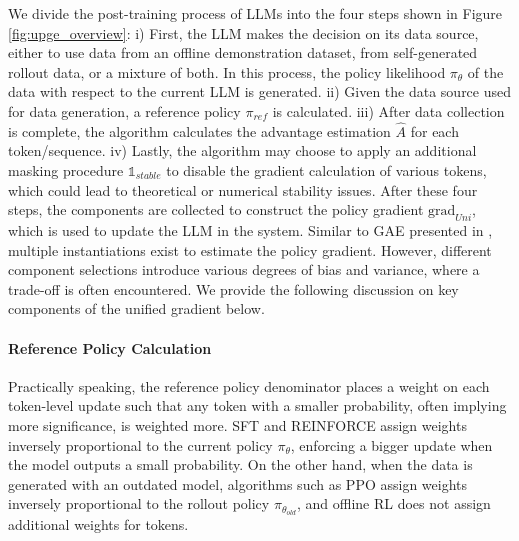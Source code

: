 We divide the post-training process of LLMs into the four steps shown in Figure \ref{fig:upge_overview}: i) First, the LLM makes the decision on its data source, either to use data from an offline demonstration dataset, from self-generated rollout data, or a mixture of both. In this process, the policy likelihood $\pi_\theta$ of the data with respect to the current LLM is generated. ii) Given the data source used for data generation, a reference policy $\pi_{ref}$ is calculated. iii) After data collection is complete, the algorithm calculates the advantage estimation $\hat{A}$ for each token/sequence. iv) Lastly, the algorithm may choose to apply an additional masking procedure $\mathbb{1}_{stable}$ to disable the gradient calculation of various tokens, which could lead to theoretical or numerical stability issues. After these four steps, the components are collected to construct the policy gradient $\text{grad}_{Uni}$, which is used to update the LLM in the system. 
Similar to GAE presented in \citep{schulman2015high}, multiple instantiations exist to estimate the policy gradient. However, different component selections introduce various degrees of bias and variance, where a trade-off is often encountered. 
We provide the following discussion on key components of the unified gradient below.






\paragraph{Reference Policy Calculation}
Practically speaking, the reference policy denominator places a weight on each token-level update such that any token with a smaller probability, often implying more significance, is weighted more. 
SFT and REINFORCE assign weights inversely proportional to the current policy $\pi_\theta$, enforcing a bigger update when the model outputs a small probability. 
On the other hand, when the data is generated with an outdated model, algorithms such as PPO assign weights inversely proportional to the rollout policy $\pi_{\theta_{old}}$, and offline RL does not assign additional weights for tokens.



